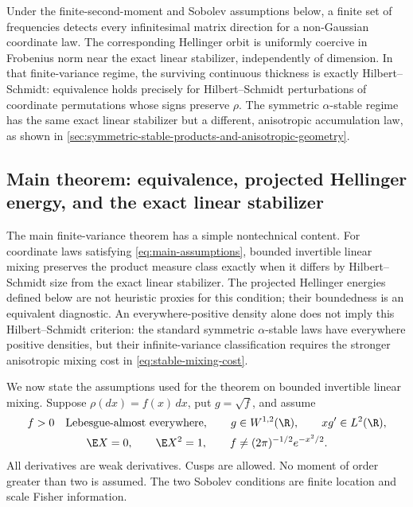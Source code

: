Under the finite-second-moment and Sobolev assumptions below, a finite set
of frequencies detects every infinitesimal matrix direction for a
non-Gaussian coordinate law.
The corresponding Hellinger orbit is uniformly coercive in Frobenius norm
near the exact linear stabilizer, independently of dimension.
In that finite-variance regime, the surviving continuous thickness is
exactly Hilbert--Schmidt: equivalence holds precisely for
Hilbert--Schmidt perturbations of coordinate permutations whose signs
preserve \(\rho\).  The symmetric \(\alpha\)-stable regime has the same exact
linear stabilizer but a different, anisotropic accumulation law, as shown in
\cref{sec:symmetric-stable-products-and-anisotropic-geometry}.

\subsection{Main theorem: equivalence, projected Hellinger energy, and the exact linear stabilizer}
\label{sec:main-results}

The main finite-variance theorem has a simple nontechnical content.
For coordinate laws satisfying \eqref{eq:main-assumptions}, bounded invertible linear mixing
preserves the product measure class exactly when it differs by
Hilbert--Schmidt size from the exact linear stabilizer.
The projected Hellinger energies defined below are not heuristic proxies for
this condition; their boundedness is an equivalent diagnostic.
An everywhere-positive density alone does not imply this Hilbert--Schmidt criterion: the
standard symmetric \(\alpha\)-stable laws have everywhere positive
densities, but their infinite-variance classification requires the stronger
anisotropic mixing cost in \eqref{eq:stable-mixing-cost}.

We now state the assumptions used for the theorem on bounded invertible linear mixing.
Suppose \(\rho(dx)=f(x)\,dx\), put \(g=\sqrt f\), and
assume
\begin{equation}
 \begin{gathered}
 f>0\quad\text{Lebesgue-almost everywhere},\qquad
 g\in W^{1,2}(\R),\qquad xg'\in L^2(\R),\\
 \E X=0,\qquad \E X^2=1,\qquad
 f\ne(2\pi)^{-1/2}e^{-x^2/2}.
 \end{gathered}
 \label{eq:main-assumptions}
\end{equation}
All derivatives are weak derivatives.
Cusps are allowed.
No moment of order greater than two is assumed.
The two Sobolev conditions are finite location and scale Fisher information.

